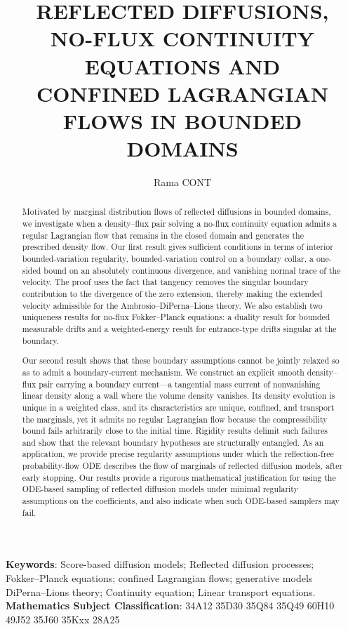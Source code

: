 \documentclass[11pt]{amsart}
\title[No-flux continuity equations and confined Lagrangian flows]{REFLECTED DIFFUSIONS,\\
NO-FLUX CONTINUITY EQUATIONS AND\\
CONFINED LAGRANGIAN FLOWS IN BOUNDED DOMAINS}
\author{Rama CONT}
\theoremstyle{definition}
\begin{document}
\maketitle
\begin{abstract}
Motivated by marginal distribution flows of reflected diffusions in bounded domains, we investigate when a density–flux pair solving a no-flux continuity equation admits a regular Lagrangian flow that remains in the closed domain and generates the prescribed density flow. Our first result gives sufficient conditions in terms of interior bounded-variation regularity, bounded-variation control on a boundary collar, a one-sided bound on an absolutely continuous divergence, and vanishing normal trace of the velocity. The proof uses the fact that tangency removes the singular boundary contribution to the divergence of the zero extension, thereby making the extended velocity admissible for the Ambrosio–DiPerna–Lions theory. We also establish two uniqueness results for no-flux Fokker–Planck equations: a duality result for bounded measurable drifts and a weighted-energy result for entrance-type drifts singular at the boundary.

Our second result shows that these boundary assumptions cannot be jointly relaxed so as to admit a boundary-current mechanism. We construct an explicit smooth density–flux pair carrying a boundary current—a tangential mass current of nonvanishing linear density along a wall where the volume density vanishes. Its density evolution is unique in a weighted class, and its characteristics are unique, confined, and transport the marginals, yet it admits no regular Lagrangian flow because the compressibility bound fails arbitrarily close to the initial time. Rigidity results delimit such failures and show that the relevant boundary hypotheses are structurally entangled. As an application, we provide precise regularity assumptions under which the reflection-free probability-flow ODE describes the flow of marginals of  reflected diffusion models,  after early stopping.  Our results 
provide a rigorous mathematical justification for using the  ODE-based sampling of reflected diffusion models under minimal regularity assumptions on the coefficients, and also indicate when such ODE-based samplers may fail.
\end{abstract}
\vskip 1cm
{\bf Keywords}: Score-based diffusion models; Reflected diffusion processes; \\
Fokker–Planck equations; confined Lagrangian flows; generative models\\
DiPerna–Lions theory;  Continuity equation;  Linear transport equations.
\vskip 1cm
\noindent
{\bf Mathematics Subject Classification}: 34A12 35D30 35Q84 35Q49 60H10 \\
49J52
 35J60 35Kxx  28A25 
\end{document}
